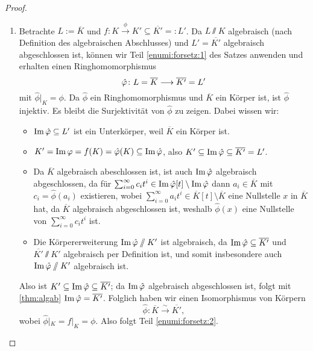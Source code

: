 \documentclass[12pt,a4paper]{scrartcl}
\begin{document}
\begin{proof}
\begin{enumerate}
\begin{itemize}
\begin{proof}[Beweis der Behauptung]
\begin{itemize}
					Also ist $(M_{\max}, \ev_{a'}\circ \beta)\in Z$, da $\ev_{a'}\circ \beta\colon M_{\max}(a)\to L'$ offensichtlich ein Ringhomomorphismus mit $(\ev_{a'}\circ \beta)|_K = \ev_{a'}|_K = f$ nach Konstruktion ist. Das ist ein Widerspruch zur Maximalität von $(M_{\max}, g_{\max})$. Damit folgt die Behauptung und insgesamt Teil \ref{enumi:forsetz:1} des Satzes.
				\end{itemize}
			\end{proof}
		\end{itemize}
		\item Betrachte $L := \overline{K}$ und $f\colon K\xrightarrow{\phi} K'\subseteq \overline{K'} =: L'$. Da $L\sslash K$ algebraisch (nach Definition des algebraischen Abschlusses) und $L' = \overline{K'}$ algebraisch abgeschlossen ist, können wir Teil \ref{enumi:forsetz:1} des Satzes anwenden und erhalten einen Ringhomomorphismus
		\[\hat{\varphi}\colon L = \overline{K}\longrightarrow \overline{K'} = L'\]
		mit $\hat{\phi}|_K = \phi$. Da $\hat\phi$ ein Ringhomomorphismus und $\overline{K}$ ein Körper ist, ist $\hat\phi$ injektiv. Es bleibt die Surjektivität von $\hat{\phi}$ zu zeigen. Dabei wissen wir:
		\begin{itemize}
			\item $\operatorname{Im}\hat{\varphi} \subseteq L'$ ist ein Unterkörper, weil $\overline{K}$ ein Körper ist.
			\item $K' = \operatorname{Im}\varphi = f(K) = \hat{\varphi}(K)\subseteq \operatorname{Im}\hat{\varphi}$, also $K'\subseteq \operatorname{Im}\hat{\varphi}\subseteq \overline{K'} = L'$.
			\item Da $\overline{K}$ algebraisch abeschlossen ist, ist auch $\operatorname{Im} \hat{\varphi}$ algebraisch abgeschlossen, da für $\sum_{i = 0}^{\infty}c_it^i\in \operatorname{Im} \hat{\varphi}[t]\setminus \operatorname{Im}\hat{\varphi}$ dann $a_i\in \overline{K}$ mit $c_i = \hat{\phi}(a_i)$ existieren, wobei $\sum_{i = 0}^{\infty} a_it^i\in \overline{K}[t]\setminus \overline{K}$ eine Nullstelle $x$ in $\overline{K}$ hat, da $\overline{K}$ algebraisch abgeschlossen ist, weshalb $\hat{\phi}(x)$ eine Nullstelle von $\sum_{i = 0}^{\infty}c_it^i$ ist.
			\item Die Körpererweiterung $\operatorname{Im}\hat{\varphi}\sslash K'$ ist algebraisch, da $\operatorname{Im}\hat{\varphi}\subseteq\overline{K'}$ und $\overline{K'}\sslash K'$ algebraisch per Definition ist, und somit insbesondere auch $\operatorname{Im}\hat{\varphi}\sslash K'$ algebraisch ist.
		\end{itemize} 
		Also ist $K'\subseteq  \operatorname{Im}\hat {\varphi}\subseteq \overline{K'}$; da $\operatorname{Im}\hat{\varphi}$ algebraisch abgeschlossen ist, folgt mit \cref{thm:algab} $\operatorname{Im}\hat{\varphi} = \overline{K'}$. Folglich haben wir einen Isomorphismus von Körpern
		\[\hat{\phi}\colon \overline{K}\xrightarrow{\sim} \overline{K'},\]
		wobei $\hat{\phi}|_K = f|_K = \phi$. Also folgt Teil \ref{enumi:forsetz:2}.
	\end{enumerate}
\end{proof}
\end{document}

